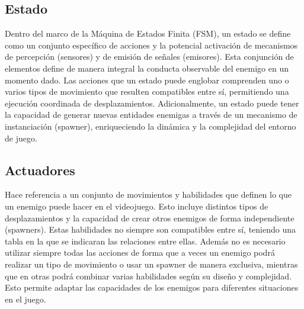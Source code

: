 \subsection{Estado}
\label{subsec:estado}

Dentro del marco de la Máquina de Estados Finita (FSM), un estado se define como un conjunto específico de acciones y la potencial activación de mecanismos de percepción (sensores) y de emisión de señales (emisores). Esta conjunción de elementos define de manera integral la conducta observable del enemigo en un momento dado. Las acciones que un estado puede englobar comprenden uno o varios tipos de movimiento que resulten compatibles entre sí, permitiendo una ejecución coordinada de desplazamientos. Adicionalmente, un estado puede tener la capacidad de generar nuevas entidades enemigas a través de un mecanismo de instanciación (spawner), enriqueciendo la dinámica y la complejidad del entorno de juego.

\subsection{Actuadores}
\label{subsec:acciones}
Hace referencia a un conjunto de movimientos y habilidades que definen lo que un enemigo puede hacer en el videojuego. Esto incluye distintos tipos de desplazamientos y la capacidad de crear otros enemigos de forma independiente (spawners). Estas habilidades no siempre son compatibles entre sí, teniendo una tabla en la que se indicaran las relaciones entre ellas. Además no es necesario utilizar siempre todas las acciones de forma que a veces un enemigo podrá realizar un tipo de movimiento o usar un spawner de manera exclusiva, mientras que en otras podrá combinar varias habilidades según su diseño y complejidad. Esto permite adaptar las capacidades de los enemigos para diferentes situaciones en el juego.

